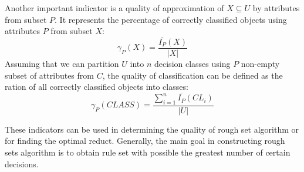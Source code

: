 Another important indicator is a quality of approximation of $X \subseteq U$ by
attributes from subset $P$. It represents the percentage of correctly classified 
objects using attributes $P$ from subset $X$:
\begin{equation}
    \gamma_P(X) = \frac{\overline{I_P}(X)}{|X|}
    \label{eq:quality_approximation}
\end{equation}
Assuming that we can partition $U$ into $n$ decision classes using $P$
non-empty subset of attributes from $C$, the quality of classification can be
defined as the ration of all correctly classified objects into classes:
\begin{equation}
    \gamma_P(CLASS) = \frac{\sum_{i=1}^{n}\overline{I_P}(CL_i)}{|U|}
    \label{eq:class_quality}
\end{equation}

These indicators can be used in determining the quality of rough set algorithm
or for finding the optimal reduct. Generally, the main goal in constructing
rough sets algorithm is to obtain rule set with possible the greatest number of
certain decisions.

